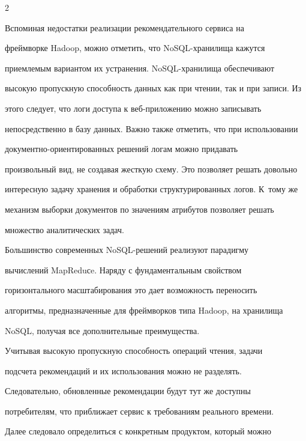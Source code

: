 \begin{multicols}{2}
   


   Вспоминая недостатки реализации рекомендательного сервиса на 


фреймворке Hadoop, можно отметить, что NoSQL-хра\-ни\-ли\-ща кажутся 


приемлемым вариантом их устранения. NoSQL-хра\-ни\-ли\-ща обеспечивают 


высокую пропускную способность данных как при чтении, так и при записи. Из 


этого следует, что логи доступа к веб-при\-ло\-же\-нию можно записывать 


непосредственно в базу данных. Важно также отметить, что при использовании 


до\-ку\-мент\-но-ориен\-ти\-ро\-ван\-ных решений логам можно придавать 


произвольный вид, не создавая жесткую схему. Это позволяет решать довольно 


интересную задачу хранения и обработки структурированных логов. К~тому же 


механизм выборки документов по значениям атрибутов позволяет решать 


множество аналитических задач.


   


   Большинство современных NoSQL-ре\-ше\-ний ре\-а\-ли\-зу\-ют парадигму 


вычислений MapReduсe. Наря\-ду с фундаментальным свойством 


горизон\-таль\-но\-го масштабирования это дает \mbox{возможность} переносить 


алгоритмы, предназначенные для фреймворков типа Hadoop, на хранилища 


NoSQL, получая все дополнительные преимущества.


   


   Учитывая высокую пропускную способность операций чтения, задачи 


подсчета рекомендаций и их использования можно не разделять. 


Следовательно, обновленные рекомендации будут тут же доступны 


потребителям, что приближает сервис к требованиям реального времени.


   


   Далее следовало определиться с конкретным продуктом, который можно 



\end{multicols}
